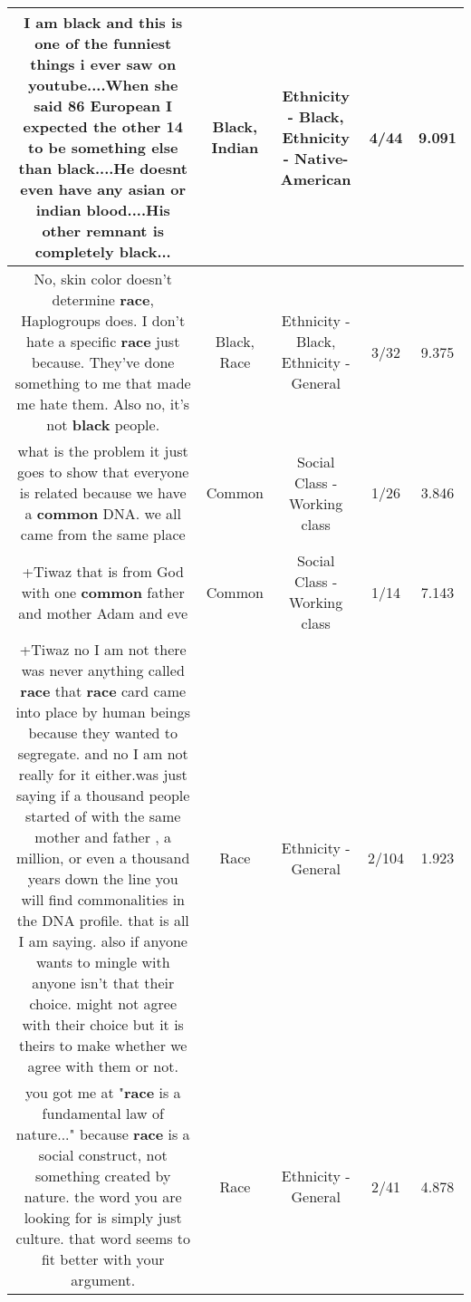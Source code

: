 \documentclass[11pt]{article}
\newlength\mylength
\begin{document}
\begin{center}
\begin{longtable}{|C{.65\mylength}|C{.30\mylength}|C{.12\mylength}|C{.12\mylength}|C{.12\mylength}|}
  \small I am \textbf{black} and this is one of the funniest things i ever saw on youtube....When she said 86 European I expected the other 14 to be something else than \textbf{black}....He doesnt even have any asian or \textbf{indian} blood....His other remnant is completely \textbf{black}...\normalsize   & Black, Indian & Ethnicity - Black, Ethnicity - Native-American & 4/44 & 9.091 \\  \hline
  \small No, skin color doesn't determine \textbf{race}, Haplogroups does. I don't hate a specific \textbf{race} just because. They've done something to me that made me hate them. Also no, it's not \textbf{black} people.\normalsize   & Black, Race & Ethnicity - Black, Ethnicity - General & 3/32 & 9.375 \\  \hline
  \small what is the problem it just goes to show that everyone is related because we have a \textbf{common} DNA. we all came from the same place\normalsize   & Common & Social Class - Working class & 1/26 & 3.846 \\  \hline
  \small +Tiwaz that is from God with one \textbf{common} father and mother Adam and eve\normalsize   & Common & Social Class - Working class & 1/14 & 7.143 \\  \hline
  \small +Tiwaz no I am not there was never anything called \textbf{race} that \textbf{race} card came into place by human beings because they wanted to segregate. and no I am not really for it either.was just saying if a thousand people started of with the same mother and father , a million, or even a thousand years down the line you will find commonalities in the DNA profile. that is all I am saying. also if anyone wants to mingle with anyone isn't that their choice. might not agree with their choice but it is theirs to make whether we agree with them or not.\normalsize   & Race & Ethnicity - General & 2/104 & 1.923 \\  \hline
  \small you got me at "\textbf{race} is a fundamental law of nature..." because \textbf{race} is a social construct, not something created by nature. the word you are looking for is simply just culture. that word seems to fit better with your argument.\normalsize   & Race & Ethnicity - General & 2/41 & 4.878 \\  \hline

\end{longtable}
\end{center}
\end{document}
